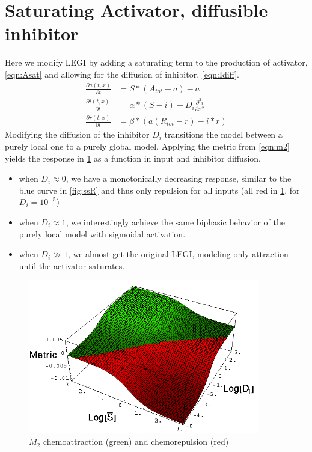 \documentclass{article}
\begin{document}
\section{Saturating Activator, diffusible inhibitor}

Here we modify LEGI by adding a saturating term to the production of
activator, \cref{eqn:Asat} and allowing for the diffusion of inhibitor,
\cref{eqn:Idiff}.
\begin{align}
    \frac{ \partial a(t,x) }{ \partial t } &= S * (A_{tot} - a) - a
        \label{eqn:Asat} \\
    \frac{ \partial i(t,x) }{ \partial t } &= \alpha * ( S - i) +
        D_i \frac{ \partial^2 i}{ \partial x^2 } \label{eqn:Idiff} \\
    \frac{ \partial r(t,x) }{ \partial t } &= \beta * ( a ( R_{tot} - r ) - i * r )
\end{align}
Modifying the diffusion of the inhibitor $D_i$ 
transitions the model between a purely local one to a purely global model.
Applying the metric from \cref{eqn:m2} yields the response in 
\cref{fig:metricVsDi} as a function in input and inhibitor diffusion.

\begin{itemize}
    \item when $D_i \approx 0$, we have a monotonically decreasing response,
        similar to the blue curve in \cref{fig:ssR} and thus only repulsion for
        all inputs (all red in \cref{fig:metricVsDi}, for $D_i = 10^{-5}$)
    \item when $D_i \approx 1$, we interestingly achieve the same
        biphasic behavior of the purely local model with sigmoidal activation. 
    \item when $D_i \gg 1$, we almost get the original LEGI, modeling only
        attraction until the activator saturates. 
\end{itemize}

\begin{figure}
    \centering
    \includegraphics[width=0.9\textwidth]{MetricVsAvgVsDi.png}
    \caption{$M_2$ chemoattraction (green) and chemorepulsion (red) \label{fig:metricVsDi}}
\end{figure}
\end{document}
